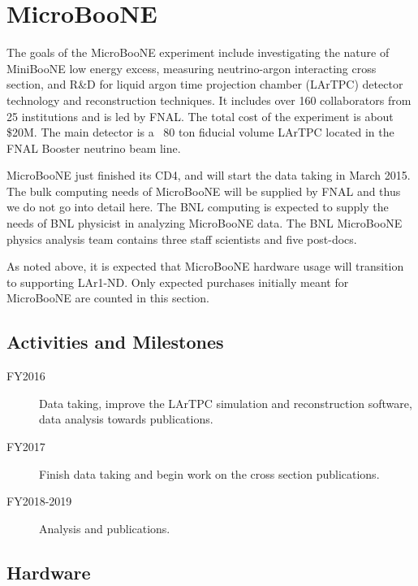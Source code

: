 \documentclass[pdftex,12pt,letter]{article}
\begin{document}
\pagebreak
\section{MicroBooNE}

The goals of the MicroBooNE experiment include investigating the nature of 
MiniBooNE low energy excess, measuring neutrino-argon interacting cross section,
and R\&D for liquid argon time projection chamber (LArTPC) detector technology 
and reconstruction techniques. It includes over 160 collaborators from 
25 institutions and is led by FNAL. The total cost of the experiment is about 
\$20M. The main detector is a ~80 ton fiducial volume LArTPC located in the 
FNAL Booster neutrino beam line. 

MicroBooNE just finished its CD4, and will start the data taking in March 2015. 
The bulk computing needs of MicroBooNE will be supplied by FNAL and 
thus we do not go into detail here. The BNL computing is expected to supply
the needs of BNL physicist in analyzing MicroBooNE data. The BNL MicroBooNE
physics analysis team contains three staff scientists and five post-docs. 

As noted above, it is expected that MicroBooNE hardware usage will
transition to supporting LAr1-ND.
Only expected purchases initially meant for MicroBooNE are counted in
this section.


\subsection{Activities and Milestones}

\begin{description}
\item[FY2016] Data taking, improve the LArTPC simulation and reconstruction software, data analysis towards publications.
\item[FY2017] Finish data taking and begin work on the cross section publications.
\item[FY2018-2019] Analysis and publications.
\end{description}

\subsection{Hardware}
\end{document}
